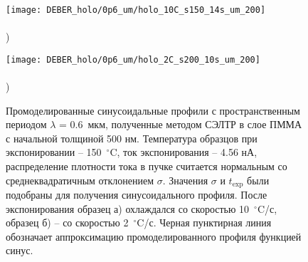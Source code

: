 \begin{figure}[t!]
	\begin{minipage}{0.48\textwidth}
		\texttt{[image: DEBER\_holo/0p6\_um/holo\_10C\_s150\_14s\_um\_200]} \\
		\vspace{-13em} \\ ) \\ \vspace{13em}
	\end{minipage}
	\begin{minipage}{0.48\textwidth}
		\texttt{[image: DEBER\_holo/0p6\_um/holo\_2C\_s200\_10s\_um\_200]} \\
		\vspace{-13em} \\ ) \\ \vspace{13em}
	\end{minipage}
	
	\vspace{-3em}
	\caption{Промоделированные синусоидальные профили с пространственным периодом $\lambda$ = 0.6~мкм, полученные методом СЭЛТР в слое ПММА с начальной толщиной 500 нм. Температура образцов при экспонировании -- 150~$^\circ$C, ток экспонирования -- 4.56 нА, распределение плотности тока в пучке считается нормальным со среднеквадратичным отклонением $\sigma$. Значения $\sigma$ и $t_\mathrm{exp}$ были подобраны для получения синусоидального профиля. После экспонирования образец а) охлаждался со скоростью 10~$^\circ$C/с, образец б) -- со скоростью 2~$^\circ$C/с. Черная пунктирная линия обозначает аппроксимацию промоделированного профиля функцией синус.}
	\label{fig:DEBER_holo_0p6um}
	\vspace{2em}
\end{figure}

